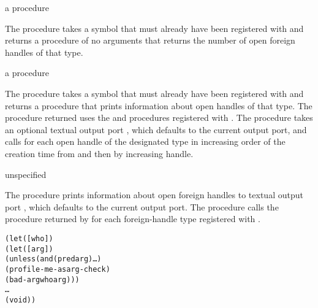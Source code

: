 \begin{procedure}
\end{procedure}
\returns{} a procedure

The  procedure takes a symbol  that
must already have been registered with 
and returns a procedure of no arguments that returns the number of open foreign
handles of that type.

\begin{procedure}
\end{procedure}
\returns{} a procedure

The  procedure takes a symbol  that
must already have been registered with  and
returns a procedure that prints information about open handles of that type.
The procedure returned uses the  and 
procedures registered with .
The procedure takes an optional textual output port , which defaults
to the current output port, and calls  for each open handle of the
designated type in increasing order of the creation time from 
and then by increasing handle.

\begin{procedure}
\end{procedure}
\returns{} unspecified

The  procedure prints information about open
foreign handles to textual output port , which defaults to the current
output port.
The  procedure
calls the procedure returned by 
for each foreign-handle type registered with .

\begin{syntax}
\end{syntax}
\expandsto{}\begin{alltt}\antipar
(let ([who ])
  (let ([arg ])
    (unless (and (pred arg) \ldots)
      (profile-me-as arg-check)
      (bad-arg who arg)))
  \ldots
  (void))\end{alltt}

